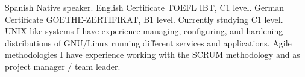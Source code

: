 \begin{cvskills}
    \cvskill
        {Spanish}
        {Native speaker.}
    \cvskill
        {English}
        {Certificate TOEFL IBT, C1 level.}
    \cvskill
        {German}
        {Certificate GOETHE-ZERTIFIKAT, B1 level. Currently studying C1 level.}
    \cvskill
        {UNIX-like systems}
        {I have experience managing, configuring, and hardening distributions of GNU/Linux running different services and applications.}
    \cvskill
        {Agile methodologies}
        {I have experience working with the SCRUM methodology and as project manager / team leader.}
\end{cvskills}
